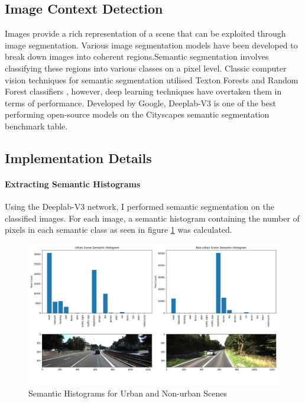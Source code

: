 \subsection{Image Context Detection}

Images provide a rich representation of a scene that can be exploited through image segmentation. Various image segmentation models have been developed to break down images into coherent regions.Semantic segmentation involves classifying these regions into various classes on a pixel level. 
Classic computer vision techniques for semantic segmentation utilised Texton Forests\cite{shotton2008semantic} and Random Forest classifiers \cite{shotton2011real}, however, deep learning techniques have overtaken them in terms of performance. 
Developed by Google,  Deeplab-V3 is one of the best performing open-source models on the Cityscapes semantic segmentation benchmark table. 

\subsection*{Implementation Details}


\paragraph{Extracting Semantic Histograms} Using the Deeplab-V3 network, I performed semantic segmentation on the classified images. For each image, a semantic histogram containing the number of pixels in each semantic class as seen in figure \ref{fig:sem_hist} was calculated. 


\begin{figure}[h]%
	\centering
	\includegraphics[width=\linewidth]{images/semantic_hist.png}%
	\caption{Semantic Histograms for Urban and Non-urban Scenes}%
	\label{fig:sem_hist}%
\end{figure} 

